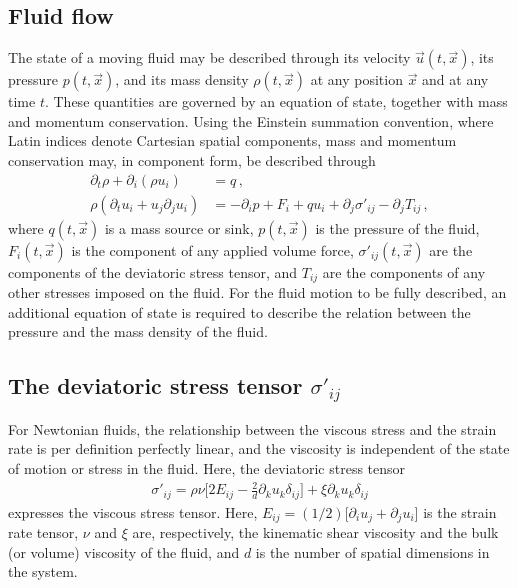 \documentclass[11pt,a4paper]{report}
\begin{document}
\subsection{Fluid flow}
\label{sec:fluid flow}
The state of a moving fluid may be described through its velocity $\vec{u}(t,\vec{x})$, its pressure $p(t,\vec{x})$, and its mass density $\rho(t,\vec{x})$ at any position $\vec{x}$ and at any time $t$.
These quantities are governed by an equation of state, together with mass and momentum conservation. Using the Einstein summation convention, where Latin indices denote Cartesian
spatial components, mass and momentum conservation may, in component form, be described through \cite{batchelor2000introduction, landau87} 
\begin{align}
\partial_t \rho + \partial_i  (\rho u_i) &= q\, , \label{eq:cont_eq}
\\
\rho \left(\partial_t u_i + u_j \partial_j
u_i \right) &= - \partial_i p  + F_i + q u_i 
+ \partial_j \sigma'_{i j} -\partial_j T_{ij}\, , \label{eq:N-S_eq} 
\end{align}
where $q(t,\vec{x})$ is a mass source or sink, $p(t,\vec{x})$ is the pressure of the fluid, $F_i(t,\vec{x})$ is the
component of any applied volume force, $\sigma'_{ij}(t,\vec{x})$ are the components of the deviatoric stress tensor, and $T_{ij}$ are the components of any other stresses imposed on the fluid. For the fluid motion to be fully described, an additional equation of state is required to describe the relation between the pressure and the mass density of the fluid. 

\subsection{The deviatoric stress tensor $\sigma'_{i j}$}
\label{sec:the deviatoric stress tensor}
For Newtonian fluids, the relationship between the viscous stress and the strain rate
is per definition perfectly linear, and the viscosity is independent of the state of
motion or stress in the fluid. Here, the deviatoric stress tensor
\begin{align}
\sigma'_{i j} = \rho \nu \bigg[2E_{i j}
-\frac{2}{d} \partial_k u_k
\delta_{i j} \bigg] + \xi \partial_k u_k
\delta_{i j} \label{eq:viscStressTensor}
\end{align}
expresses the viscous stress tensor. Here, ${E_{i j} = (1/2)\big[\partial_i u_j + \partial_j u_i\big]}$
is the strain rate tensor, $\nu$ and $\xi$ are, respectively, the kinematic shear viscosity and the bulk (or volume) viscosity of the fluid, and $d$ is the number of spatial dimensions in the system. 
\end{document}
